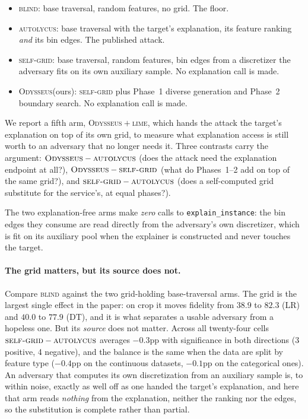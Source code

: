 \documentclass[sigconf,anonymous,review]{acmart}
\newcommand{\sys}{\textsc{Odysseus}}
\begin{document}
\begin{itemize}
  \item \textsc{blind}: base traversal, random features, no grid. The floor.
  \item \textsc{autolycus}: base traversal with the target's explanation, its feature ranking \emph{and} its bin edges. The published attack.
  \item \textsc{self-grid}: base traversal, random features, bin edges from a discretizer the
  adversary fits on its own auxiliary sample. No explanation call is made.
  \item \sys (ours): \textsc{self-grid} plus Phase~1 diverse generation and
  Phase~2 boundary search. No explanation call is made.
\end{itemize}

We report a fifth arm, \sys${}+{}$\textsc{lime}, which hands the attack the target's
explanation on top of its own grid, to measure what explanation access is still worth to an adversary
that no longer needs it. Three contrasts carry the argument:
$\sys-\textsc{autolycus}$ (does the attack need the explanation endpoint at all?),
$\sys-\textsc{self-grid}$ (what do Phases~1--2 add on top of the same grid?), and
$\textsc{self-grid}-\textsc{autolycus}$ (does a self-computed grid substitute for the service's, at
equal phases?).

The two explanation-free arms make \emph{zero} calls to \texttt{explain\_instance}: the bin edges they
consume are read directly from the adversary's own discretizer, which is fit on its auxiliary pool
when the explainer is constructed and never touches the target.


\paragraph{The grid matters, but its source does not.} Compare \textsc{blind} against the two
grid-holding base-traversal arms. The grid is the largest single effect in the paper: on crop it moves
fidelity from $38.9$ to $82.3$ (LR) and $40.0$ to $77.9$ (DT), and it is what separates a usable
adversary from a hopeless one. But its \emph{source} does not matter. Across all twenty-four cells
$\textsc{self-grid}-\textsc{autolycus}$ averages $-0.3$pp with significance in both directions
(3 positive, 4 negative), and the balance is the same when the data are split by feature type
($-0.4$pp on the continuous datasets, $-0.1$pp on the categorical ones). An adversary that computes
its own discretization from an auxiliary sample is, to within noise, exactly as well off as one handed the target's explanation, and here that arm reads \emph{nothing} from the explanation, neither the
ranking nor the edges, so the substitution is complete rather than partial.
\end{document}
